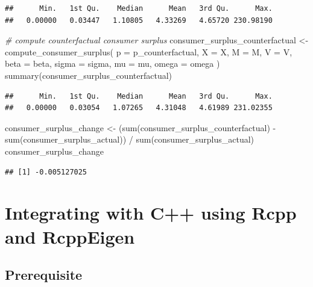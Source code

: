 \documentclass[
]{book}
\newenvironment{Shaded}{\begin{snugshade}}{\end{snugshade}}
\newcommand{\AttributeTok}[1]{\textcolor[rgb]{0.77,0.63,0.00}{#1}}
\newcommand{\CommentTok}[1]{\textcolor[rgb]{0.56,0.35,0.01}{\textit{#1}}}
\newcommand{\FunctionTok}[1]{\textcolor[rgb]{0.00,0.00,0.00}{#1}}
\newcommand{\NormalTok}[1]{#1}
\newcommand{\OtherTok}[1]{\textcolor[rgb]{0.56,0.35,0.01}{#1}}
\newcommand{\SpecialCharTok}[1]{\textcolor[rgb]{0.00,0.00,0.00}{#1}}
\begin{document}
\begin{verbatim}
##      Min.   1st Qu.    Median      Mean   3rd Qu.      Max. 
##   0.00000   0.03447   1.10805   4.33269   4.65720 230.98190
\end{verbatim}

\begin{Shaded}
\begin{Highlighting}[]
\CommentTok{\# compute counterfactual consumer surplus}
\NormalTok{consumer\_surplus\_counterfactual }\OtherTok{\textless{}{-}} 
  \FunctionTok{compute\_consumer\_surplus}\NormalTok{(}
    \AttributeTok{p =}\NormalTok{ p\_counterfactual, }
    \AttributeTok{X =}\NormalTok{ X, }
    \AttributeTok{M =}\NormalTok{ M, }
    \AttributeTok{V =}\NormalTok{ V, }
    \AttributeTok{beta =}\NormalTok{ beta, }
    \AttributeTok{sigma =}\NormalTok{ sigma, }
    \AttributeTok{mu =}\NormalTok{ mu, }
    \AttributeTok{omega =}\NormalTok{ omega}
\NormalTok{    )}
\FunctionTok{summary}\NormalTok{(consumer\_surplus\_counterfactual)}
\end{Highlighting}
\end{Shaded}

\begin{verbatim}
##      Min.   1st Qu.    Median      Mean   3rd Qu.      Max. 
##   0.00000   0.03054   1.07265   4.31048   4.61989 231.02355
\end{verbatim}

\begin{Shaded}
\begin{Highlighting}[]
\NormalTok{consumer\_surplus\_change }\OtherTok{\textless{}{-}} 
\NormalTok{  (}\FunctionTok{sum}\NormalTok{(consumer\_surplus\_counterfactual) }\SpecialCharTok{{-}} 
     \FunctionTok{sum}\NormalTok{(consumer\_surplus\_actual)) }\SpecialCharTok{/}
  \FunctionTok{sum}\NormalTok{(consumer\_surplus\_actual)}
\NormalTok{consumer\_surplus\_change}
\end{Highlighting}
\end{Shaded}

\begin{verbatim}
## [1] -0.005127025
\end{verbatim}

\hypertarget{rcpp}{%
\chapter{Integrating with C++ using Rcpp and RcppEigen}\label{rcpp}}

\hypertarget{prerequisite}{%
\section{Prerequisite}\label{prerequisite}}
\end{document}
